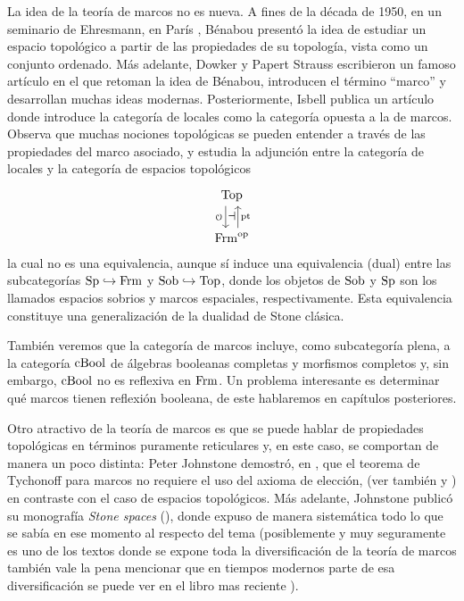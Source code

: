 La idea de la teoría de marcos no es nueva.
A fines de la década de 1950, en un seminario de Ehresmann,
en París \cite{Gattungen}, Bénabou
presentó la idea de estudiar un espacio topológico a partir
de las propiedades de su topología, vista como un conjunto ordenado.
Más adelante, Dowker y Papert Strauss escribieron un famoso artículo
\cite{Quotients}
en el que retoman la idea de Bénabou, introducen el término ``marco''
y desarrollan muchas ideas modernas.
Posteriormente, Isbell publica un artículo \cite{atomless-parts}
donde introduce
la categoría de locales como la categoría opuesta a la de marcos.
Observa que muchas nociones topológicas se pueden entender
a través de las propiedades del marco asociado,
y estudia la adjunción entre la categoría de locales y la categoría
de espacios topológicos
\[
    \begin{tikzcd}
        \Top \ar[d,"\cal O"'{name=izq},shift right=2] \\
        \Frm^\op \ar[u,"\pt"'{name=der},shift right=2]
        \adj{izq}{der}
    \end{tikzcd}
\]
la cual no es una equivalencia,
aunque sí induce una equivalencia (dual) entre las subcategorías
$\mathrm{Sp}\hookrightarrow\mathrm{Frm}$ y $\mathrm{Sob}\hookrightarrow\mathrm{Top}$,
donde los objetos de $\mathrm{Sob}$ y $\mathrm{Sp}$ son los llamados espacios sobrios
y marcos espaciales, respectivamente.
Esta equivalencia constituye una generalización de la dualidad
de Stone clásica.

También veremos que la categoría de marcos incluye,
como subcategoría plena, a la categoría $\mathrm{cBool}$ de álgebras booleanas
completas y morfismos completos y, sin embargo, $\mathrm{cBool}$ no es reflexiva
en $\mathrm{Frm}$.
Un problema interesante es determinar qué marcos tienen reflexión booleana, de este hablaremos en capítulos posteriores.


Otro atractivo de la teoría de marcos es que se puede hablar
de propiedades topológicas en términos puramente reticulares y,
en este caso, se comportan de manera un poco distinta:
Peter Johnstone demostró, en \cite{johnstone1981tychonoff}, que el teorema de Tychonoff
para marcos no requiere el uso del axioma de elección, (ver también \cite{banaschewski1988another} y \cite{kvrivz1985constructive})
en contraste con el caso de espacios topológicos.
Más adelante, Johnstone publicó su monografía \emph{Stone spaces} (\cite{johnstone1986stone}),
donde expuso de manera sistemática todo lo que se sabía en ese momento
al respecto del tema (posiblemente y muy seguramente es uno de los textos donde se expone toda la diversificación de la teoría de marcos también vale la pena mencionar que en tiempos modernos parte de esa diversificación se puede ver en el libro mas reciente \cite{picado2021separation}).

